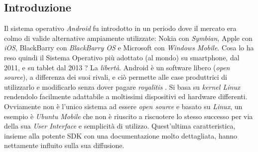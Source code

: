 \subsection{Introduzione}
Il sistema operativo \textit{Android} fu introdotto in un periodo dove il mercato era colmo di valide alternative ampiamente utilizzate: Nokia con \textit{Symbian}, Apple con \textit{iOS}, BlackBarry con \textit{BlackBarry OS} e Microsoft con \textit{Windows Mobile}. Cosa lo ha reso quindi il Sistema Operativo più adottato (al mondo) \cite{androidwikipedia} su smartphone, dal 2011, e su tablet dal 2013 ? La \textit{libertà}. Android è un software libero (\textit{open source}), a differenza dei suoi rivali, e ciò permette alle case produttrici di utilizzarlo e modificarlo senza dover pagare \textit{royalitis} \cite{androides}. Si basa su \textit{kernel Linux} \cite{androiden} rendendolo facilmente adattabile a moltissimi dispositivi ed hardware differenti. Ovviamente non è l'unico sistema ad essere \textit{open source} e basato su \textit{Linux}, un esempio è \textit{Ubuntu Mobile} che non è riuscito a riscuotere lo stesso successo per via della sua \textit{User Interface} e semplicità di utilizzo. Quest'ultima caratteristica, insieme alla potente SDK con una documentazione molto dettagliata, hanno nettamente influito sulla sua diffusione.
